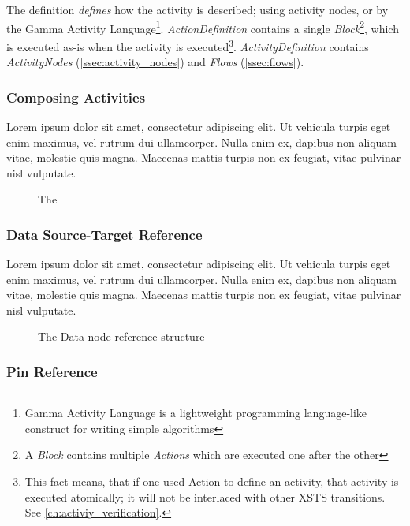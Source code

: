 The definition \emph{defines} how the activity is described; using activity nodes, or by the Gamma Activity Language\footnote{Gamma Activity Language is a lightweight programming language-like construct for writing simple algorithms}. \emph{ActionDefinition} contains a single \emph{Block}\footnote{A \emph{Block} contains multiple \emph{Actions} which are executed one after the other}, which is executed as-is when the activity is executed\footnote{This fact means, that if one used Action to define an activity, that activity is executed atomically; it will not be interlaced with other XSTS transitions. See \autoref{ch:activiy_verification}.}. \emph{ActivityDefinition} contains \emph{ActivityNodes} (\autoref{ssec:activity_nodes}) and \emph{Flows} (\autoref{ssec:flows}).

\subsubsection{Composing Activities}

Lorem ipsum dolor sit amet, consectetur adipiscing elit. Ut vehicula turpis eget enim maximus, vel rutrum dui ullamcorper. Nulla enim ex, dapibus non aliquam vitae, molestie quis magna. Maecenas mattis turpis non ex feugiat, vitae pulvinar nisl vulputate.

\begin{figure}[!ht]
	\centering
	
	\caption{The }
	\label{fig:composite_activity}
\end{figure}

\subsubsection{Data Source-Target Reference}

Lorem ipsum dolor sit amet, consectetur adipiscing elit. Ut vehicula turpis eget enim maximus, vel rutrum dui ullamcorper. Nulla enim ex, dapibus non aliquam vitae, molestie quis magna. Maecenas mattis turpis non ex feugiat, vitae pulvinar nisl vulputate.

\begin{figure}[!ht]
	\centering
	
	\caption{The Data node reference structure}
	\label{fig:data_source_target_reference}
\end{figure}

\subsubsection{Pin Reference}

